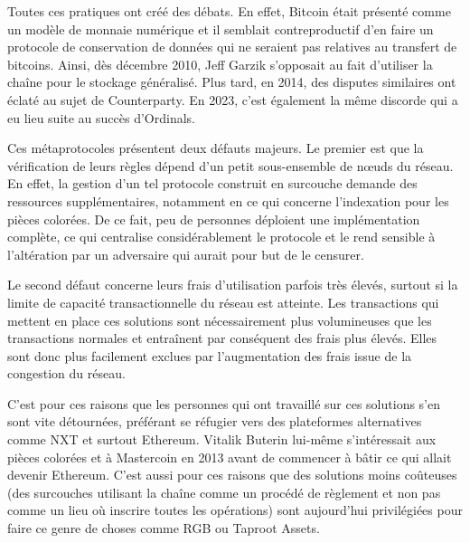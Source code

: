 Toutes ces pratiques ont créé des débats. En effet, Bitcoin était présenté comme un modèle de monnaie numérique et il semblait contreproductif d'en faire un protocole de conservation de données qui ne seraient pas relatives au transfert de bitcoins. Ainsi, dès décembre 2010, Jeff Garzik s'opposait au fait d'utiliser la chaîne pour le stockage généralisé. Plus tard, en 2014, des disputes similaires ont éclaté au sujet de Counterparty. En 2023, c'est également la même discorde qui a eu lieu suite au succès d'Ordinals.

Ces métaprotocoles présentent deux défauts majeurs. Le premier est que la vérification de leurs règles dépend d'un petit sous-ensemble de nœuds du réseau. En effet, la gestion d'un tel protocole construit en surcouche demande des ressources supplémentaires, notamment en ce qui concerne l'indexation pour les pièces colorées. De ce fait, peu de personnes déploient une implémentation complète, ce qui centralise considérablement le protocole et le rend sensible à l'altération par un adversaire qui aurait pour but de le censurer.

Le second défaut concerne leurs frais d'utilisation parfois très élevés, surtout si la limite de capacité transactionnelle du réseau est atteinte. Les transactions qui mettent en place ces solutions sont nécessairement plus volumineuses que les transactions normales et entraînent par conséquent des frais plus élevés. Elles sont donc plus facilement exclues par l'augmentation des frais issue de la congestion du réseau.

C'est pour ces raisons que les personnes qui ont travaillé sur ces solutions s'en sont vite détournées, préférant se réfugier vers des plateformes alternatives comme NXT et surtout Ethereum. Vitalik Buterin lui-même s'intéressait aux pièces colorées et à Mastercoin en 2013 avant de commencer à bâtir ce qui allait devenir Ethereum. C'est aussi pour ces raisons que des solutions moins coûteuses (des surcouches utilisant la chaîne comme un procédé de règlement et non pas comme un lieu où inscrire toutes les opérations) sont aujourd'hui privilégiées pour faire ce genre de choses comme RGB ou Taproot Assets.

